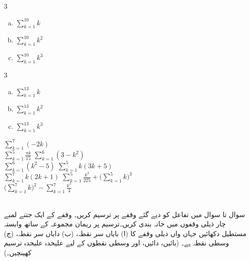 \begin{multicols}{3}
\begin{enumerate}[a.]
\item
$\sum\limits_{k=1}^{10} k$
\item
$\sum\limits_{k=1}^{10}k^2$
\item
$\sum\limits_{k=1}^{10}k^3$
\end{enumerate}
\end{multicols}
\begin{multicols}{3}
\begin{enumerate}[a.]
\item
$\sum\limits_{k=1}^{13} k$
\item
$\sum\limits_{k=1}^{13}k^2$
\item
$\sum\limits_{k=1}^{13}k^3$
\end{enumerate}
\end{multicols}
$\sum\limits_{k=1}^7 (-2k)$\\
$\sum\limits_{k=1}^5 \tfrac{\pi k}{15}$
$\sum\limits_{k=1}^6 (3-k^2)$\\
$\sum\limits_{k=1}^6 (k^2-5)$
$\sum\limits_{k=1}^5 k(3k+5)$\\
$\sum\limits_{k=1}^7 k(2k+1)$
$\sum\limits_{k=1}^5 \tfrac{k^3}{225}+\big(\sum\limits_{k=1}^5 k\big)^3$\\
$\big(\sum\limits_{k=1}^7 k\big)^2-\sum\limits_{k=1}^7 \tfrac{k^3}{4}$

\\
سوال  تا سوال  میں تفاعل  کو دیے گئے وقفے پر ترسیم کریں۔ وقفے کے ایک جتنے لمبے چار ذیلی وقفوں میں خانہ بندی کریں۔ترسیم پر ریمان مجموعہ  کے ساتھ وابستہ مستطیل دکھائیں جہاں  واں  ذیلی وقفے  کا  (ا) بایاں سر نقطہ، (ب) دایاں سر نقطہ، (ج) وسطی نقطہ   ہے۔ (بائیں، دائیں،  اور وسطی نقطوں کے لیے علیحدہ علیحدہ ترسیم کھینچیں۔)
%


